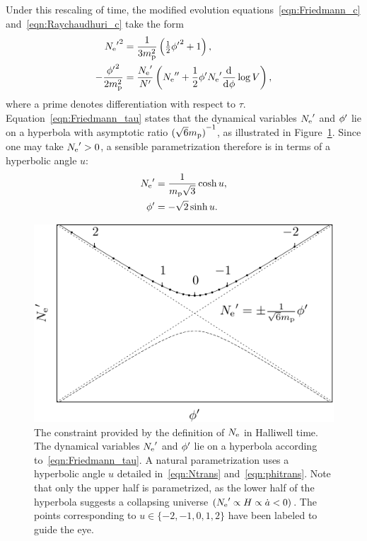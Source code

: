 Under this rescaling of time, the modified evolution equations~\eqref{eqn:Friedmann_c} and~\eqref{eqn:Raychaudhuri_c} take the form
%
\begin{align}
  {{N_\mathrm{e}}^\prime}^2 
  &= 
  \frac{1}{3m_{\mathrm{p}}^2}\left({\textstyle\frac{1}{2}}{{\phi}^\prime}^2 + 1 \right),
  \label{eqn:Friedmann_tau} 
  \\
  -\frac{{{\phi}^\prime}^2}{2m_{\mathrm{p}}^2} 
  &= 
  \frac{{{N_\mathrm{e}}^\prime}}{{{N}^\prime}}\left({{N_\mathrm{e}}^{\prime\prime}} 
  +\frac{1}{2} {{\phi}^\prime}{{N_\mathrm{e}}^\prime} \frac{\operatorname{d}^{}\!{}}{\operatorname{d}^{}\!{\phi}}\log V \right),  
  \label{eqn:Raychaudhuri_tau}
\end{align}
%
where a prime denotes differentiation with respect to $\tau$.  Equation~\eqref{eqn:Friedmann_tau} states that the dynamical variables ${{N_\mathrm{e}}^\prime}$ and ${{\phi}^\prime}$ lie on a hyperbola with asymptotic ratio ${(\sqrt{6}m_{\mathrm{p}})}^{-1}$, as illustrated in Figure~\ref{fig:figure_hyperbola}. Since one may take ${{N_\mathrm{e}}^\prime}>0$, a sensible parametrization therefore is in terms of a hyperbolic angle $u$:
%
\begin{align}
  {{N_\mathrm{e}}^\prime} 
  &= 
  \frac{1}{m_{\mathrm{p}}\sqrt{3}}\cosh u,
  \label{eqn:Ntrans}
  \\
  {{\phi}^\prime} 
  &= 
  -\sqrt{2}\sinh u.
  \label{eqn:phitrans}
\end{align}
%
%
\begin{figure}[ht]
  \includegraphics[width=\textwidth]{chapter_kinetic_dominance/figures/hyperbola}
  \caption{The constraint provided by the definition of $N_\mathrm{e}$ in Halliwell time. The dynamical variables ${{N_\mathrm{e}}^\prime}$ and ${{\phi}^\prime}$ lie on a hyperbola according to~\protect\eqref{eqn:Friedmann_tau}. A natural parametrization uses a hyperbolic angle $u$ detailed in~\protect\eqref{eqn:Ntrans} and~\protect\eqref{eqn:phitrans}. Note that only the upper half is parametrized, as the lower half of the hyperbola suggests a collapsing universe $({{N_\mathrm{e}}^\prime}\propto H\propto\dot{a}<0)$. The points corresponding to $u\in\{-2,-1,0,1,2\}$ have been labeled to guide the eye.}\label{fig:figure_hyperbola}
\end{figure}
